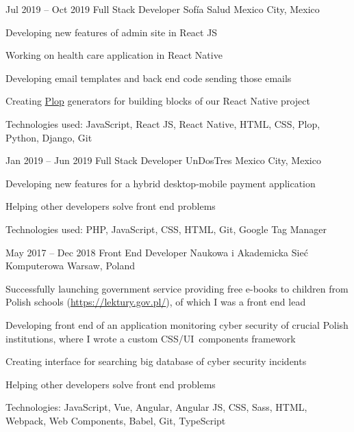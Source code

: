 \begin{sectionlist}
    \sectionlistitemjob
        {Jul 2019 -- Oct 2019}
        {Full Stack Developer}
        {Sofía Salud}
        {Mexico City, Mexico}
        {
            \begin{joblisting}
                \item Developing new features of admin site in React JS
                \item Working on health care application in React Native
                \item Developing email templates and back end code sending those emails
                \item Creating \href{https://plopjs.com/}{Plop} generators for
                    building blocks of our React Native project
                \item Technologies used: JavaScript, React JS, React Native,
                    HTML, CSS, Plop, Python, Django, Git
            \end{joblisting}
        }

    \sectionlistitemjob
        {Jan 2019 -- Jun 2019}
        {Full Stack Developer}
        {UnDosTres}
        {Mexico City, Mexico}
        {
            \begin{joblisting}
                \item Developing new features for a hybrid desktop-mobile
                    payment application
                \item Helping other developers solve front end problems
                \item Technologies used: PHP, JavaScript, CSS, HTML, Git,
                    Google Tag Manager
            \end{joblisting}
        }

    \sectionlistitemjob
        {May 2017 -- Dec 2018}
        {Front End Developer}
        {Naukowa i Akademicka Sie\'{c} Kom\-pu\-te\-ro\-wa \hfill \linebreak}
        {Warsaw, Poland}
        {
            \begin{joblisting}
                \item Successfully launching government service providing free
                    e-books to children from Polish schools
                    (\url{https://lektury.gov.pl/}), of which I was a front end
                    lead
                \item Developing front end of an application monitoring
                    cyber security of crucial Polish institutions,
                    where I wrote a custom CSS/UI~components framework
                \item Creating interface for searching big database of cyber
                    security incidents
                \item Helping other developers solve front end problems
                \item Technologies: JavaScript, Vue, Angular, Angular JS,
                    CSS, Sass, HTML, Webpack, Web Components, Babel, Git,
                    TypeScript
            \end{joblisting}
        }


\end{sectionlist}
